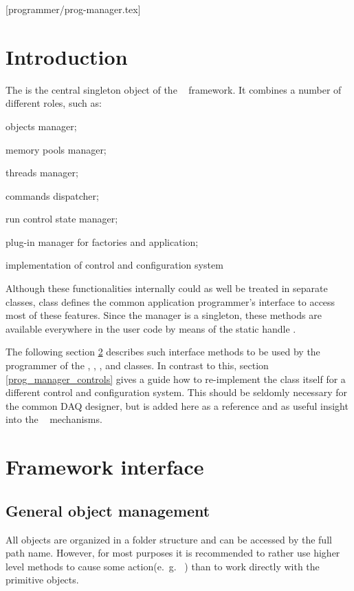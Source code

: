 [programmer/prog-manager.tex]

\section{Introduction}
The  is the central singleton object of the
\dabc~ framework. 
It combines a number of different roles, such as:

\bcir
\item objects manager;
\item memory pools manager;
\item threads manager;
\item commands dispatcher;
\item run control state manager;
\item plug-in manager for factories and application;
\item implementation of control and configuration system
\ecir

Although these functionalities internally could as well be treated in
separate classes,  class defines the common
application programmer's interface to access most of these features.
Since the manager is a singleton,
these methods are available everywhere in the user code
by means of the static handle .


The following section \ref{prog_manager_framework} describes such interface methods to
be used by the programmer of the , , , and  classes.
In contrast to this, section \ref{prog_manager_controls} gives a guide how to
re-implement the  class itself for a different control and configuration
system. This should be seldomly  necessary for the common DAQ designer, 
but is added here as a reference and as useful insight into the \dabc~ mechanisms.


\section{Framework interface}
\label{prog_manager_framework}

\subsection{General object management}
\label{prog_manager_framework_objects}
All objects are organized in a folder structure and can be accessed
by the full path name. However, for most purposes it is recommended
to rather use higher level  methods to cause some
action(e.~g.~ ) than to work directly with the
primitive objects. 

